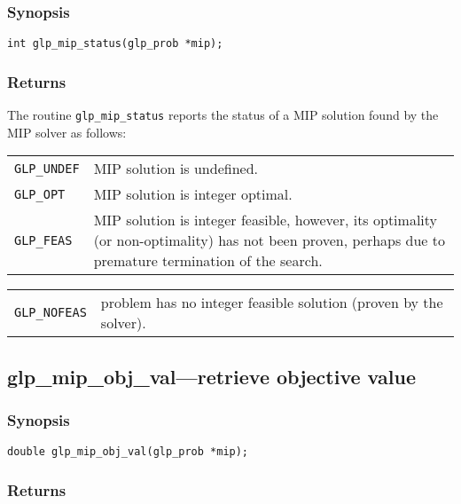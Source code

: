 \subsubsection*{Synopsis}

\begin{verbatim}
int glp_mip_status(glp_prob *mip);
\end{verbatim}

\subsubsection*{Returns}

The routine \verb|glp_mip_status| reports the status of a MIP solution
found by the MIP solver as follows:

\smallskip

\begin{tabular}{@{}p{25mm}p{91.3mm}@{}}
\verb|GLP_UNDEF| & MIP solution is undefined. \\
\verb|GLP_OPT|   & MIP solution is integer optimal. \\
\verb|GLP_FEAS|  & MIP solution is integer feasible, however, its
   optimality (or non-optimality) has not been proven, perhaps due to
   premature termination of the search. \\
\end{tabular}

\begin{tabular}{@{}p{25mm}p{91.3mm}@{}}
\verb|GLP_NOFEAS| & problem has no integer feasible solution (proven by
   the solver). \\
\end{tabular}

\subsection{glp\_mip\_obj\_val---retrieve objective value}

\subsubsection*{Synopsis}

\begin{verbatim}
double glp_mip_obj_val(glp_prob *mip);
\end{verbatim}

\subsubsection*{Returns}

